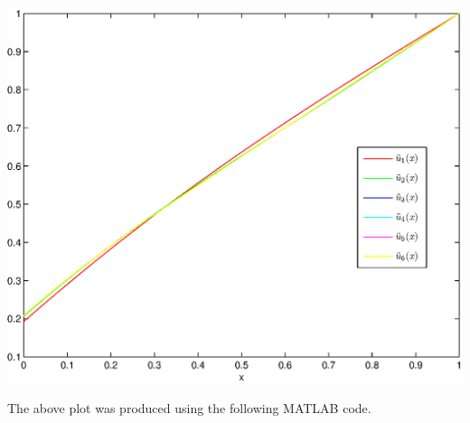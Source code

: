\begin{solution}
\begin{enumerate}
\begin{center}\includegraphics[scale=0.7]{hw72e.eps}\end{center}

The above plot was produced using the following MATLAB code.



\end{enumerate}
\end{solution}